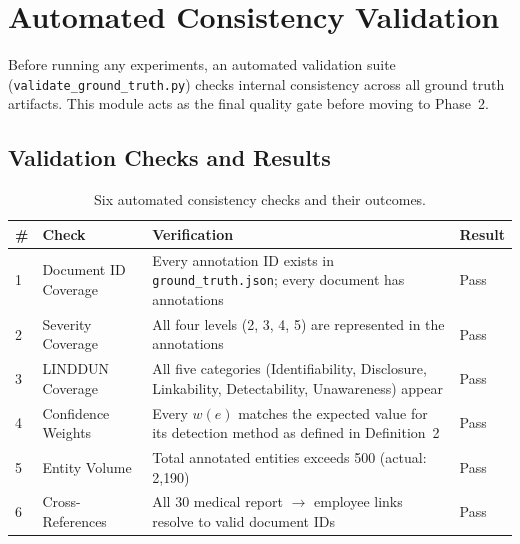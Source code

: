 \documentclass[12pt, a4paper]{article}
\begin{document}
\newpage
\section{Automated Consistency Validation}
\label{sec:validation}

Before running any experiments, an automated validation suite (\texttt{validate\_ground\_truth.py}) checks internal consistency across all ground truth artifacts. This module acts as the final quality gate before moving to Phase~2.

\subsection{Validation Checks and Results}

\begin{table}[H]
\centering
\caption{Six automated consistency checks and their outcomes.}
\label{tab:validation}
\small
{}
\begin{tabular}{C{0.7cm} L{3.8cm} L{6.8cm} C{1.5cm}}
\toprule
{}
\color{white}\textbf{\#} &
\color{white}\textbf{Check} &
\color{white}\textbf{Verification} &
\color{white}\textbf{Result} \\
 & Document ID Coverage    & Every annotation ID exists in \texttt{ground\_truth.json}; every document has annotations & Pass \\
2 & Severity Coverage       & All four levels (2, 3, 4, 5) are represented in the annotations & Pass \\
3 & LINDDUN Coverage        & All five categories (Identifiability, Disclosure, Linkability, Detectability, Unawareness) appear & Pass \\
4 & Confidence Weights      & Every $w(e)$ matches the expected value for its detection method as defined in Definition~2 & Pass \\
5 & Entity Volume           & Total annotated entities exceeds 500 (actual: 2{,}190) & Pass \\
6 & Cross-References        & All 30 medical report $\to$ employee links resolve to valid document IDs & Pass \\
\bottomrule
\end{tabular}
\end{table}
\end{document}
